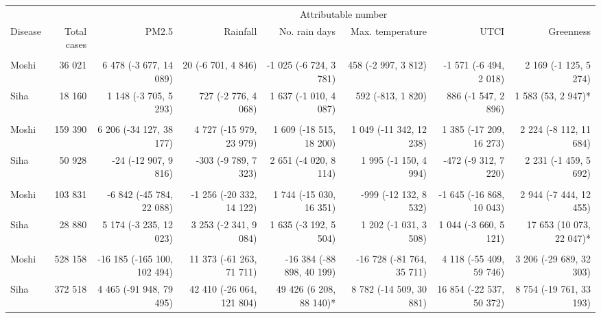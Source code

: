\begin{table}[t]
\fontsize{12.0pt}{14.4pt}\selectfont
\begin{tabular*}{\linewidth}{@{\extracolsep{\fill}}l|rrrrrrr}
\toprule
 &  & \multicolumn{6}{c}{Attributable number} \\ 
\cmidrule(lr){3-8}
Disease & Total cases & PM2.5 & Rainfall & No. rain days & Max. temperature & UTCI & Greenness \\ 
\midrule\addlinespace[2.5pt]
\multicolumn{8}{l}{Chronic Respiratory Disease} \\[2.5pt] 
\midrule\addlinespace[2.5pt]
Moshi & 36 021 & 6 478 (-3 677, 14 089)  & 20 (-6 701, 4 846)  & -1 025 (-6 724, 3 781)  & 458 (-2 997, 3 812)  & -1 571 (-6 494, 2 018)  & 2 169 (-1 125, 5 274)  \\ 
Siha & 18 160 & 1 148 (-3 705, 5 293)  & 727 (-2 776, 4 068)  & 1 637 (-1 010, 4 087)  & 592 (-813, 1 820)  & 886 (-1 547, 2 896)  & 1 583 (53, 2 947)* \\ 
\midrule\addlinespace[2.5pt]
\multicolumn{8}{l}{Hypertension} \\[2.5pt] 
\midrule\addlinespace[2.5pt]
Moshi & 159 390 & 6 206 (-34 127, 38 177)  & 4 727 (-15 979, 23 979)  & 1 609 (-18 515, 18 200)  & 1 049 (-11 342, 12 238)  & 1 385 (-17 209, 16 273)  & 2 224 (-8 112, 11 684)  \\ 
Siha & 50 928 & -24 (-12 907, 9 816)  & -303 (-9 789, 7 323)  & 2 651 (-4 020, 8 114)  & 1 995 (-1 150, 4 994)  & -472 (-9 312, 7 220)  & 2 231 (-1 459, 5 692)  \\ 
\midrule\addlinespace[2.5pt]
\multicolumn{8}{l}{Diabetes Mellitus} \\[2.5pt] 
\midrule\addlinespace[2.5pt]
Moshi & 103 831 & -6 842 (-45 784, 22 088)  & -1 256 (-20 332, 14 122)  & 1 744 (-15 030, 16 351)  & -999 (-12 132, 8 532)  & -1 645 (-16 868, 10 043)  & 2 944 (-7 444, 12 455)  \\ 
Siha & 28 880 & 5 174 (-3 235, 12 023)  & 3 253 (-2 341, 9 084)  & 1 635 (-3 192, 5 504)  & 1 202 (-1 031, 3 508)  & 1 044 (-3 660, 5 121)  & 17 653 (10 073, 22 047)* \\ 
\midrule\addlinespace[2.5pt]
\multicolumn{8}{l}{Upper Respiratory Infections} \\[2.5pt] 
\midrule\addlinespace[2.5pt]
Moshi & 528 158 & -16 185 (-165 100, 102 494)  & 11 373 (-61 263, 71 711)  & -16 384 (-88 898, 40 199)  & -16 728 (-81 764, 35 711)  & 4 118 (-55 409, 59 746)  & 3 206 (-29 689, 32 303)  \\ 
Siha & 372 518 & 4 465 (-91 948, 79 495)  & 42 410 (-26 064, 121 804)  & 49 426 (6 208, 88 140)* & 8 782 (-14 509, 30 881)  & 16 854 (-22 537, 50 372)  & 8 754 (-19 761, 33 193)  \\ 

\end{tabular*}
\end{table}
